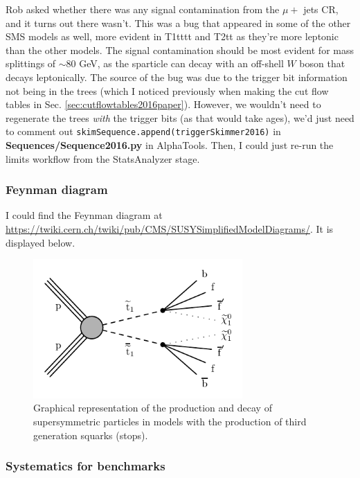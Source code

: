 
Rob asked whether there was any signal contamination from the $\mu +$ jets CR, and it turns out there wasn't. This was a bug that appeared in some of the other SMS models as well, more evident in T1tttt and T2tt as they're more leptonic than the other models. The signal contamination should be most evident for mass splittings of $\sim 80$ GeV, as the sparticle can decay with an off-shell $W$ boson that decays leptonically. The source of the bug was due to the trigger bit information not being in the trees (which I noticed previously when making the cut flow tables in Sec. \ref{sec:cutflowtables2016paper}). However, we wouldn't need to regenerate the trees \emph{with} the trigger bits (as that would take ages), we'd just need to comment out \texttt{skimSequence.append(triggerSkimmer2016)} in \textbf{Sequences/Sequence2016.py} in AlphaTools. Then, I could just re-run the limits workflow from the StatsAnalyzer stage.


\subsubsection{Feynman diagram}

I could find the Feynman diagram at \url{https://twiki.cern.ch/twiki/pub/CMS/SUSYSimplifiedModelDiagrams/}. It is displayed below.

\begin{figure}[H]
\centering
\includegraphics[width=80mm]{./sec31/T2tt-4bd_Feynman_diagram.pdf}
\caption{Graphical representation of the production and decay of supersymmetric particles in models with the production of third generation squarks (stops).}
\end{figure}


\subsubsection{Systematics for benchmarks}

